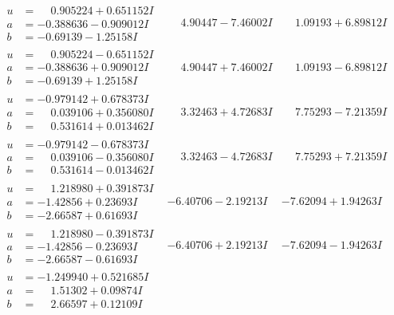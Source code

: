 \documentclass[1p]{elsarticle_modified}
\theoremstyle{definition}
\begin{document}
$$\begin{array}{c|c|c}
\begin{aligned}
u &= \phantom{-}0.905224 + 0.651152 I \\
a &= -0.388636 - 0.909012 I \\
b &= -0.69139 - 1.25158 I\end{aligned}
 & \phantom{-}4.90447 - 7.46002 I & \phantom{-}1.09193 + 6.89812 I \\ \hline\begin{aligned}
u &= \phantom{-}0.905224 - 0.651152 I \\
a &= -0.388636 + 0.909012 I \\
b &= -0.69139 + 1.25158 I\end{aligned}
 & \phantom{-}4.90447 + 7.46002 I & \phantom{-}1.09193 - 6.89812 I \\ \hline\begin{aligned}
u &= -0.979142 + 0.678373 I \\
a &= \phantom{-}0.039106 + 0.356080 I \\
b &= \phantom{-}0.531614 + 0.013462 I\end{aligned}
 & \phantom{-}3.32463 + 4.72683 I & \phantom{-}7.75293 - 7.21359 I \\ \hline\begin{aligned}
u &= -0.979142 - 0.678373 I \\
a &= \phantom{-}0.039106 - 0.356080 I \\
b &= \phantom{-}0.531614 - 0.013462 I\end{aligned}
 & \phantom{-}3.32463 - 4.72683 I & \phantom{-}7.75293 + 7.21359 I \\ \hline\begin{aligned}
u &= \phantom{-}1.218980 + 0.391873 I \\
a &= -1.42856 + 0.23693 I \\
b &= -2.66587 + 0.61693 I\end{aligned}
 & -6.40706 - 2.19213 I & -7.62094 + 1.94263 I \\ \hline\begin{aligned}
u &= \phantom{-}1.218980 - 0.391873 I \\
a &= -1.42856 - 0.23693 I \\
b &= -2.66587 - 0.61693 I\end{aligned}
 & -6.40706 + 2.19213 I & -7.62094 - 1.94263 I \\ \hline\begin{aligned}
u &= -1.249940 + 0.521685 I \\
a &= \phantom{-}1.51302 + 0.09874 I \\
b &= \phantom{-}2.66597 + 0.12109 I\end{aligned}

\end{array}$$
\end{document}
